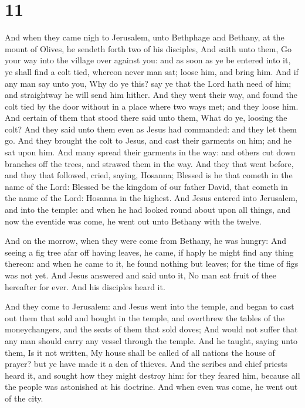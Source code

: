 \hypertarget{section-10}{%
\section{11}\label{section-10}}

 And when they came nigh to Jerusalem, unto Bethphage and
Bethany, at the mount of Olives, he sendeth forth two of his disciples,
 And saith unto them, Go your way into the village over
against you: and as soon as ye be entered into it, ye shall find a colt
tied, whereon never man sat; loose him, and bring him.  And
if any man say unto you, Why do ye this? say ye that the Lord hath need
of him; and straightway he will send him hither.  And they
went their way, and found the colt tied by the door without in a place
where two ways met; and they loose him.  And certain of them
that stood there said unto them, What do ye, loosing the colt?
 And they said unto them even as Jesus had commanded: and
they let them go.  And they brought the colt to Jesus, and
cast their garments on him; and he sat upon him.  And many
spread their garments in the way: and others cut down branches off the
trees, and strawed them in the way.  And they that went
before, and they that followed, cried, saying, Hosanna; Blessed is he
that cometh in the name of the Lord:  Blessed be the
kingdom of our father David, that cometh in the name of the Lord:
Hosanna in the highest.  And Jesus entered into Jerusalem,
and into the temple: and when he had looked round about upon all things,
and now the eventide was come, he went out unto Bethany with the twelve.

 And on the morrow, when they were come from Bethany, he
was hungry:  And seeing a fig tree afar off having leaves,
he came, if haply he might find any thing thereon: and when he came to
it, he found nothing but leaves; for the time of figs was not yet.
 And Jesus answered and said unto it, No man eat fruit of
thee hereafter for ever. And his disciples heard it.

 And they come to Jerusalem: and Jesus went into the
temple, and began to cast out them that sold and bought in the temple,
and overthrew the tables of the moneychangers, and the seats of them
that sold doves;  And would not suffer that any man should
carry any vessel through the temple.  And he taught, saying
unto them, Is it not written, My house shall be called of all nations
the house of prayer? but ye have made it a den of thieves. 
And the scribes and chief priests heard it, and sought how they might
destroy him: for they feared him, because all the people was astonished
at his doctrine.  And when even was come, he went out of
the city.


